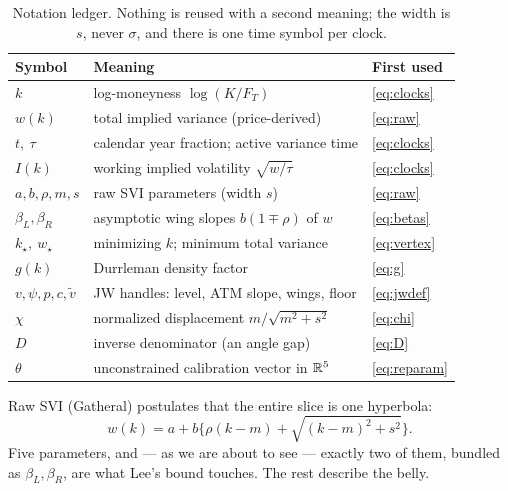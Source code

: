 \documentclass[11pt]{article}
\newcommand{\Iv}{I}                 %
\newcommand{\wmin}{w_\star}         %
\newcommand{\kmin}{k_\star}         %
\newcommand{\vmin}{\widetilde v}    %
\newcommand{\betL}{\beta_L}
\newcommand{\betR}{\beta_R}
\begin{document}
\begin{table}[H]
\centering
\small
\setlength{\tabcolsep}{5pt}
\renewcommand{\arraystretch}{1.18}
\begin{tabular}{@{}lll@{}}
\toprule
Symbol & Meaning & First used\\
\midrule
$k$ & log-moneyness $\log(K/F_T)$ & \eqref{eq:clocks}\\
$w(k)$ & total implied variance (price-derived) & \eqref{eq:raw}\\
$t,\ \tau$ & calendar year fraction; active variance time & \eqref{eq:clocks}\\
$\Iv(k)$ & working implied volatility $\sqrt{w/\tau}$ & \eqref{eq:clocks}\\
$a,b,\rho,m,s$ & raw SVI parameters (width $s$) & \eqref{eq:raw}\\
$\betL,\betR$ & asymptotic wing slopes $b(1\mp\rho)$ of $w$ & \eqref{eq:betas}\\
$\kmin,\ \wmin$ & minimizing $k$; minimum total variance & \eqref{eq:vertex}\\
$g(k)$ & Durrleman density factor & \eqref{eq:g}\\
$v,\psi,p,c,\vmin$ & JW handles: level, ATM slope, wings, floor & \eqref{eq:jwdef}\\
$\chi$ & normalized displacement $m/\sqrt{m^2+s^2}$ & \eqref{eq:chi}\\
$D$ & inverse denominator (an angle gap) & \eqref{eq:D}\\
$\theta$ & unconstrained calibration vector in $\mathbb{R}^5$ & \eqref{eq:reparam}\\
\bottomrule
\end{tabular}
\caption{Notation ledger.  Nothing is reused with a second meaning; the width
is $s$, never $\sigma$, and there is one time symbol per clock.}
\label{tab:ledger}
\end{table}

Raw SVI (Gatheral) postulates that the entire slice is one hyperbola:
\begin{equation}
\boxed{\;w(k)=a+b\Big\{\rho(k-m)+\sqrt{(k-m)^2+s^2}\Big\}.\;}
\label{eq:raw}
\end{equation}
Five parameters, and --- as we are about to see --- exactly two of them, bundled
as $\betL,\betR$, are what Lee's bound touches.  The rest describe the belly.
\end{document}
